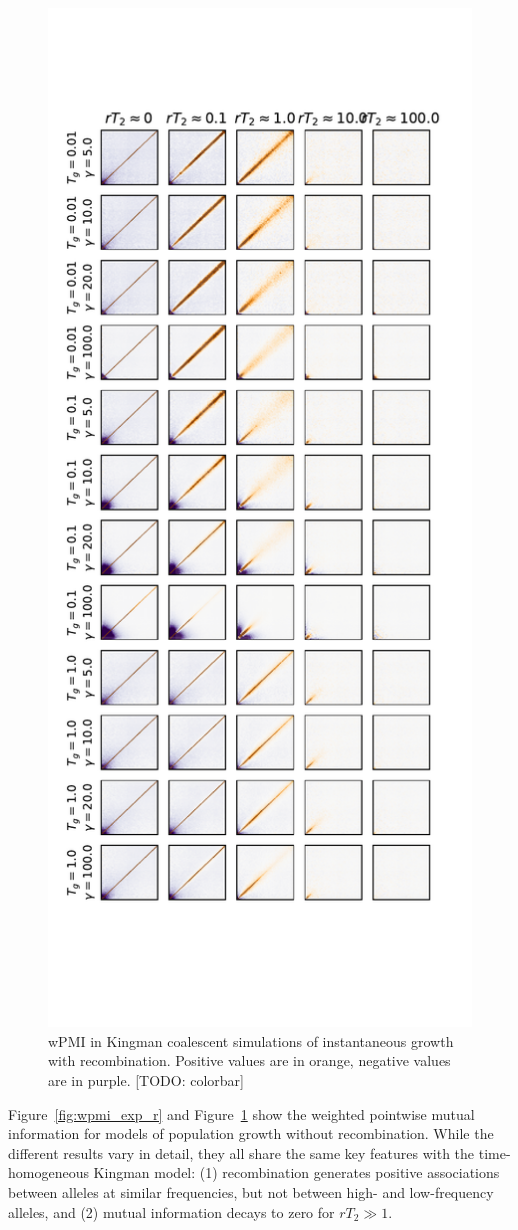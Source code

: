 \documentclass[11pt, letterpaper]{article}   	%
\newcommand{\Fig}[1]{Figure~\ref{#1}}
\begin{document}
\begin{figure}
\centering
\includegraphics[width=.6\textwidth]{figures/wpmi_step_r.pdf}
\caption{wPMI in Kingman coalescent simulations of instantaneous growth with recombination. Positive values are in orange, negative values are in purple. [TODO: colorbar]\label{fig:wpmi_step_r}}
\end{figure}

\Fig{fig:wpmi_exp_r} and \Fig{fig:wpmi_step_r} show the weighted pointwise mutual information for models of population growth without recombination.
While the different results vary in detail, they all share the same key features with the time-homogeneous Kingman model:
(1) recombination generates positive associations between alleles at similar frequencies, but not between high- and low-frequency alleles, and
(2) mutual information decays to zero for $rT_2 \gg 1$.
\end{document}
